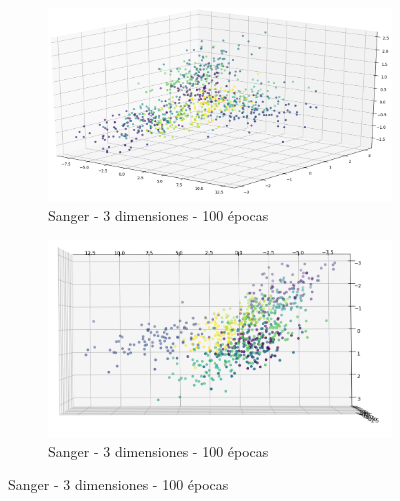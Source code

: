 \begin{figure}[!htbp]
\centering
\begin{subfigure}{.5\textwidth}
  \centering
  \includegraphics[width=1\linewidth, scale=1]{../img/ej1/sanger/sanger_3salida_100ep_train.png}
  \caption{Sanger - 3 dimensiones - 100 épocas}
  \label{fig:sub1}
\end{subfigure}%
\begin{subfigure}{.5\textwidth}
  \centering
  \includegraphics[width=1\linewidth, scale=1]{../img/ej1/sanger/sanger_3salida_100ep_train_3.png}
  \caption{Sanger - 3 dimensiones - 100 épocas}
  \label{fig:sub2}
\end{subfigure}
\end{figure}

